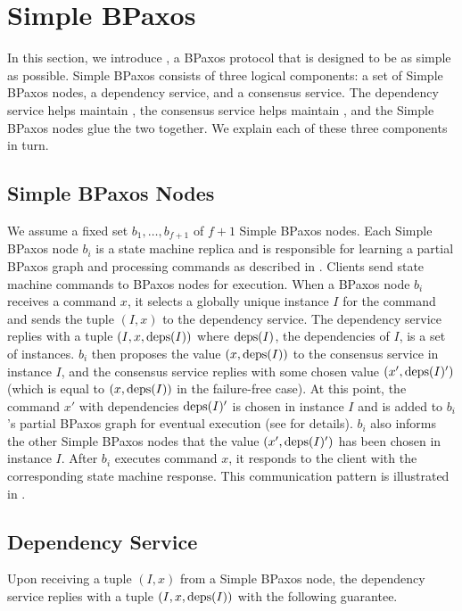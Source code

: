 \section{Simple BPaxos}
In this section, we introduce , a BPaxos protocol that
is designed to be as simple as possible.
%
Simple BPaxos consists of three logical components: a set of Simple BPaxos
nodes, a dependency service, and a consensus service. The dependency service
helps maintain , the consensus service helps maintain
, and the Simple BPaxos nodes glue the two together.
We explain each of these three components in turn.

\subsection{Simple BPaxos Nodes}

We assume a fixed set $b_1, \ldots, b_{f+1}$ of $f + 1$ Simple BPaxos nodes.
Each Simple BPaxos node $b_i$ is a state machine replica and is responsible for
learning a partial BPaxos graph and processing commands as described in
.
%
Clients send state machine commands to BPaxos nodes for execution. When a
BPaxos node $b_i$ receives a command $x$, it selects a globally unique instance
$I$ for the command and sends the tuple $(I, x)$ to the dependency service. The
dependency service replies with a tuple $(I, x, \text{deps}(I))$ where $\text{deps}(I)$,
the dependencies of $I$, is a set of instances.
%
$b_i$ then proposes the value $(x, \text{deps}(I))$ to the consensus service in
instance $I$, and the consensus service replies with some chosen value $(x',
\text{deps}(I)')$ (which is equal to $(x, \text{deps}(I))$ in the failure-free case). At
this point, the command $x'$ with dependencies $\text{deps}(I)'$ is chosen in instance
$I$ and is added to $b_i$'s partial BPaxos graph for eventual execution (see
 for details). $b_i$ also informs the other
Simple BPaxos nodes that the value $(x', \text{deps}(I)')$ has been chosen in
instance $I$.
%
After $b_i$ executes command $x$, it responds to the client with the
corresponding state machine response.
%
This communication pattern is illustrated in .

\subsection{Dependency Service}
Upon receiving a tuple $(I, x)$ from a Simple BPaxos node, the dependency
service replies with a tuple $(I, x, \text{deps}(I))$ with the following guarantee.

